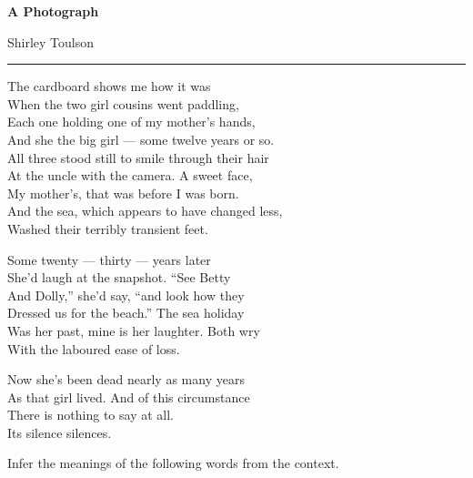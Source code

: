 \documentclass[11pt,a4paper]{article}
\begin{document}
\begin{flushleft}
    {\Huge{}\selectfont\color{magenta-text}\textbf{A Photograph}}
    
    \vspace{0.5em}
    \hfill {\Large{}\selectfont Shirley Toulson}
    
    \vspace{1.5em}
    \rule{\linewidth}{0.5pt}
    \vspace{2em}

    \noindent The cardboard shows me how it was\\
    When the two girl cousins went paddling,\\
    Each one holding one of my mother’s hands,\\
    And she the big girl --- some twelve years or so.\\
    All three stood still to smile through their hair\\
    At the uncle with the camera. A sweet face,\\
    My mother’s, that was before I was born.\\
    And the sea, which appears to have changed less,\\
    Washed their terribly transient feet.
    
    \vspace{1.5em}
    
    \noindent Some twenty --- thirty --- years later\\
    She’d laugh at the snapshot. ``See Betty\\
    And Dolly,'' she’d say, ``and look how they\\
    Dressed us for the beach.'' The sea holiday\\
    Was her past, mine is her laughter. Both wry\\
    With the laboured ease of loss.
    
    \vspace{1.5em}
    
    \noindent Now she’s been dead nearly as many years\\
    As that girl lived. And of this circumstance\\
    There is nothing to say at all.\\
    Its silence silences.

    \vspace{3em}

    \noindent Infer the meanings of the following words from the context.
    

\end{flushleft}
\end{document}
